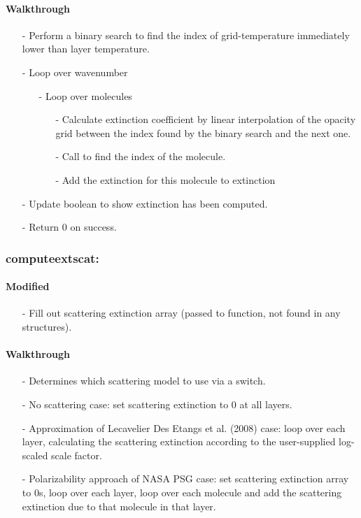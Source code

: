 \documentclass[letterpaper,12pt]{article}
\begin{document}
\paragraph{Walkthrough}
\begin{enumerate}[leftmargin=10pt, noitemsep, parsep=0pt, topsep=0ex]
\item[-] Perform a binary search to find the index of grid-temperature immediately lower than layer temperature.
\item[-] Loop over wavenumber
\begin{enumerate}[leftmargin=10pt, noitemsep, parsep=0pt, topsep=0ex]
\item[-] Loop over molecules
\begin{enumerate}[leftmargin=10pt, noitemsep, parsep=0pt, topsep=0ex]
\item[-] Calculate extinction coefficient by linear interpolation of the opacity grid between the index found by the binary search and the next one.
\item[-] Call  to find the index of the molecule.
\item[-] Add the extinction for this molecule to extinction
\end{enumerate}
\end{enumerate}
\item[-] Update boolean to show extinction has been computed.
\item[-] Return 0 on success.
\end{enumerate}

\subsubsection{computeextscat:}
\paragraph{Modified}
\begin{enumerate}[leftmargin=10pt, noitemsep, parsep=0pt, topsep=0ex]
\item[-] Fill out scattering extinction array (passed to function, not found in any structures).
\end{enumerate}

\paragraph{Walkthrough}
\begin{enumerate}[leftmargin=10pt, noitemsep, parsep=0pt, topsep=0ex]
\item[-] Determines which scattering model to use via a switch.
\item[-] No scattering case: set scattering extinction to 0 at all layers.
\item[-] Approximation of Lecavelier Des Etangs et al. (2008) case: loop over each layer, calculating the scattering extinction according to the user-supplied log-scaled scale factor.
\item[-] Polarizability approach of NASA PSG case: set scattering extinction array to 0s, loop over each layer, loop over each molecule and add the scattering extinction due to that molecule in that layer.
\end{enumerate}
\end{document}
